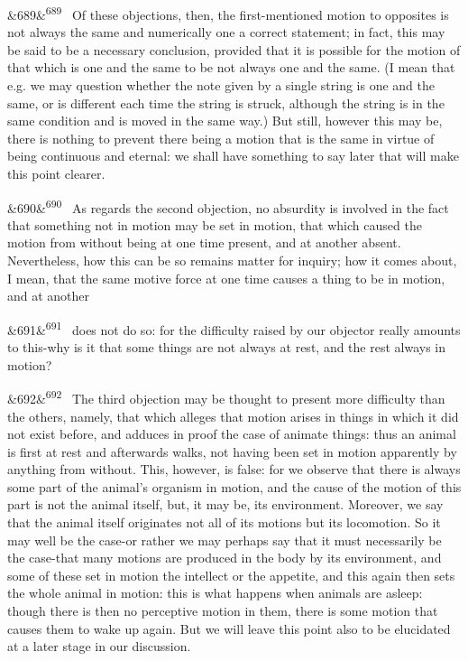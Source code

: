 \documentclass[12pt]{article}
\newcommand{\para}[1][]{\par\noindent\ifx&#1&\else\textsuperscript{\footnotesize #1}~\fi}
\begin{document}
\para[689] Of these objections, then, the first-mentioned motion to opposites is not always the same and numerically one a correct statement; in fact, this may be said to be a necessary conclusion, provided that it is possible for the motion of that which is one and the same to be not always one and the same. (I mean that e.g. we may question whether the note given by a single string is one and the same, or is different each time the string is struck, although the string is in the same condition and is moved in the same way.) But still, however this may be, there is nothing to prevent there being a motion that is the same in virtue of being continuous and eternal: we shall have something to say later that will make this point clearer.

\para[690] As regards the second objection, no absurdity is involved in the fact that something not in motion may be set in motion, that which caused the motion from without being at one time present, and at another absent. Nevertheless, how this can be so remains matter for inquiry; how it comes about, I mean, that the same motive force at one time causes a thing to be in motion, and at another

\para[691] does not do so: for the difficulty raised by our objector really amounts to this-why is it that some things are not always at rest, and the rest always in motion?

\para[692] The third objection may be thought to present more difficulty than the others, namely, that which alleges that motion arises in things in which it did not exist before, and adduces in proof the case of animate things: thus an animal is first at rest and afterwards walks, not having been set in motion apparently by anything from without. This, however, is false: for we observe that there is always some part of the animal's organism in motion, and the cause of the motion of this part is not the animal itself, but, it may be, its environment. Moreover, we say that the animal itself originates not all of its motions but its locomotion. So it may well be the case-or rather we may perhaps say that it must necessarily be the case-that many motions are produced in the body by its environment, and some of these set in motion the intellect or the appetite, and this again then sets the whole animal in motion: this is what happens when animals are asleep: though there is then no perceptive motion in them, there is some motion that causes them to wake up again. But we will leave this point also to be elucidated at a later stage in our discussion.
\end{document}
